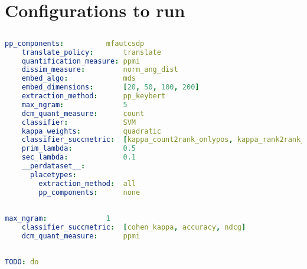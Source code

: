 \section{Configurations to run \mainalgos}
\label{ap:yamls_for_origalgos}


% 

\subsection{\textcite{Derrac2015}}

\begin{lstlisting}[language=yaml, caption={YAML for \textcite{Derrac2015}}]
    pp_components:          mfautcsdp
    translate_policy:       translate
    quantification_measure: ppmi
    dissim_measure:         norm_ang_dist
    embed_algo:             mds
    embed_dimensions:       [20, 50, 100, 200]
    extraction_method:      pp_keybert
    max_ngram:              5                   
    dcm_quant_measure:      count
    classifier:             SVM
    kappa_weights:          quadratic
    classifier_succmetric:  [kappa_count2rank_onlypos, kappa_rank2rank_onlypos_min] 
    prim_lambda:            0.5
    sec_lambda:             0.1
    __perdataset__:
      placetypes:
        extraction_method:  all 
        pp_components:      none
\end{lstlisting}

\subsection{\textcite{Ager2018}}

\begin{lstlisting}[language=yaml, caption={YAML for \textcite{Ager2018}}]
    max_ngram:              1
    classifier_succmetric:  [cohen_kappa, accuracy, ndcg]
    dcm_quant_measure:      ppmi    
\end{lstlisting}


\subsection{\textcite{Alshaikh2020}}

\begin{lstlisting}[language=yaml, caption={YAML for \textcite{Alshaikh2020}}]
    TODO: do
\end{lstlisting}
